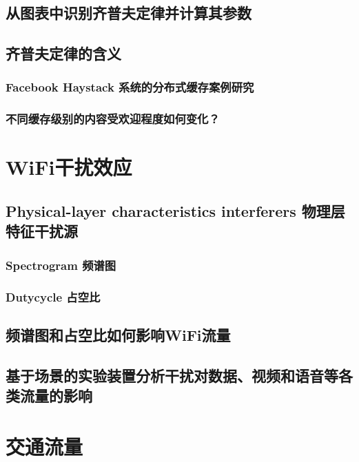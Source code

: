 \section{从图表中识别齐普夫定律并计算其参数}

\section{齐普夫定律的含义}

\subsection{Facebook Haystack 系统的分布式缓存案例研究}

\subsection{不同缓存级别的内容受欢迎程度如何变化？}


\chapter{WiFi干扰效应}

\section{Physical-layer characteristics interferers 物理层特征干扰源}

\subsection{Spectrogram 频谱图}

\subsection{Dutycycle 占空比}

\section{频谱图和占空比如何影响WiFi流量}

\section{基于场景的实验装置分析干扰对数据、视频和语音等各类流量的影响}

\chapter{交通流量}

